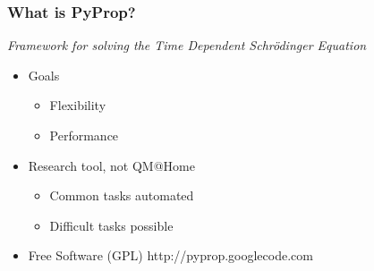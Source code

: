 \documentclass{beamer}
\begin{document}
\begin{frame}
	\frametitle{What is PyProp?}

	\textit{Framework for solving the Time Dependent Schrödinger Equation}

	\begin{itemize}
		\item<2-> Goals
			\begin{itemize}
				\item Flexibility
				\item Performance
			\end{itemize}
		\item<3-> Research tool, not QM@Home
			\begin{itemize}
				\item Common tasks automated
				\item Difficult tasks possible
			\end{itemize}
		\item<4-> Free Software (GPL) http://pyprop.googlecode.com
	\end{itemize}
\end{frame}
\end{document}
